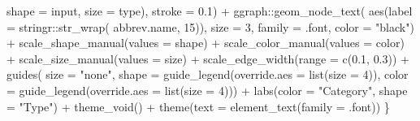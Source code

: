 \documentclass[
]{article}
\newenvironment{Shaded}{\begin{snugshade}}{\end{snugshade}}
\newcommand{\AttributeTok}[1]{\textcolor[rgb]{0.77,0.63,0.00}{#1}}
\newcommand{\DecValTok}[1]{\textcolor[rgb]{0.00,0.00,0.81}{#1}}
\newcommand{\FloatTok}[1]{\textcolor[rgb]{0.00,0.00,0.81}{#1}}
\newcommand{\FunctionTok}[1]{\textcolor[rgb]{0.00,0.00,0.00}{#1}}
\newcommand{\NormalTok}[1]{#1}
\newcommand{\SpecialCharTok}[1]{\textcolor[rgb]{0.00,0.00,0.00}{#1}}
\newcommand{\StringTok}[1]{\textcolor[rgb]{0.31,0.60,0.02}{#1}}
\begin{document}
\begin{Shaded}
\begin{Highlighting}[]
        \AttributeTok{shape =}\NormalTok{ input,}
        \AttributeTok{size =}\NormalTok{ type),}
      \AttributeTok{stroke =} \FloatTok{0.1}\NormalTok{) }\SpecialCharTok{+} 
\NormalTok{    ggraph}\SpecialCharTok{::}\FunctionTok{geom\_node\_text}\NormalTok{(}
      \FunctionTok{aes}\NormalTok{(}\AttributeTok{label =}\NormalTok{ stringr}\SpecialCharTok{::}\FunctionTok{str\_wrap}\NormalTok{(}
\NormalTok{          abbrev.name, }\DecValTok{15}\NormalTok{)),}
      \AttributeTok{size =} \DecValTok{3}\NormalTok{,}
      \AttributeTok{family =}\NormalTok{ .font,}
      \AttributeTok{color =} \StringTok{"black"}\NormalTok{) }\SpecialCharTok{+}
    \FunctionTok{scale\_shape\_manual}\NormalTok{(}\AttributeTok{values =}\NormalTok{ shape) }\SpecialCharTok{+}
    \FunctionTok{scale\_color\_manual}\NormalTok{(}\AttributeTok{values =}\NormalTok{ color) }\SpecialCharTok{+}
    \FunctionTok{scale\_size\_manual}\NormalTok{(}\AttributeTok{values =}\NormalTok{ size) }\SpecialCharTok{+}
    \FunctionTok{scale\_edge\_width}\NormalTok{(}\AttributeTok{range =} \FunctionTok{c}\NormalTok{(}\FloatTok{0.1}\NormalTok{, }\FloatTok{0.3}\NormalTok{)) }\SpecialCharTok{+} 
    \FunctionTok{guides}\NormalTok{(}
      \AttributeTok{size =} \StringTok{"none"}\NormalTok{,}
      \AttributeTok{shape =} \FunctionTok{guide\_legend}\NormalTok{(}\AttributeTok{override.aes =} \FunctionTok{list}\NormalTok{(}\AttributeTok{size =} \DecValTok{4}\NormalTok{)),}
      \AttributeTok{color =} \FunctionTok{guide\_legend}\NormalTok{(}\AttributeTok{override.aes =} \FunctionTok{list}\NormalTok{(}\AttributeTok{size =} \DecValTok{4}\NormalTok{))) }\SpecialCharTok{+}
    \FunctionTok{labs}\NormalTok{(}\AttributeTok{color =} \StringTok{"Category"}\NormalTok{, }\AttributeTok{shape =} \StringTok{"Type"}\NormalTok{) }\SpecialCharTok{+}
    \FunctionTok{theme\_void}\NormalTok{() }\SpecialCharTok{+}
    \FunctionTok{theme}\NormalTok{(}\AttributeTok{text =} \FunctionTok{element\_text}\NormalTok{(}\AttributeTok{family =}\NormalTok{ .font))}
\NormalTok{\}}


\end{Highlighting}
\end{Shaded}
\end{document}
